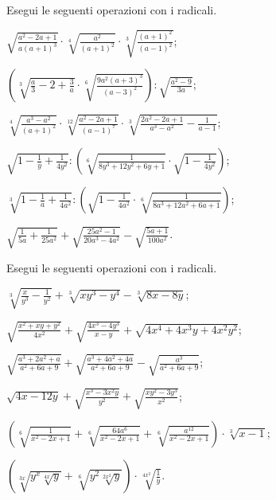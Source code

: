\begin{esercizio}[\Ast]
 \label{ese:2.81}
Esegui le seguenti operazioni con i radicali.
 \begin{enumeratea}
 \item $\sqrt{\frac{a^2-2a+1}{a(a+1)^3}}\cdot \sqrt[4]{\frac{a^2}{(a+1)^2}}\cdot \sqrt[3]{\frac{(a+1)^2}{(a-1)^2}}$;
 \item $\left(\sqrt[3]{\frac a 3-2+\frac 3 a}\cdot \sqrt[6]{\frac{9a^2(a+3)^3}{(a-3)^2}}\right):\sqrt{\frac{a^2-9}{3a}}$;
 \item $\sqrt[4]{\frac{a^3-a^2}{(a+1)^2}}\cdot \sqrt[12]{\frac{a^2-2a+1}{(a-1)^7}}\cdot \sqrt[3]{\frac{2a^2-2a+1}{a^3-a^2}-\frac 1{a-1}}$;
 \item $\sqrt{1-\frac 1 y+\frac 1{4y^2}}:\left(\sqrt[6]{\frac 1{8y^3+12y^2+6y+1}}\cdot \sqrt{1-\frac 1{4y^2}}\right)$;
 \item $\sqrt[3]{1-\frac 1 a+\frac 1{4a^2}}:\left(\sqrt{1-\frac 1{4a^2}}\cdot \sqrt[6]{\frac 1{8a^3+12a^2+6a+1}}\right)$;
 \item $\sqrt{\frac 1{5a}+\frac 1{25a^2}}+\sqrt{\frac{25a^2-1}{20a^3-4a^2}}-\sqrt{\frac{5a+1}{100a^2}}$.
 \end{enumeratea}
\end{esercizio}

\begin{esercizio}[\Ast]
 \label{ese:2.82}
Esegui le seguenti operazioni con i radicali.
 \begin{enumeratea}
 \item $\sqrt[3]{\frac x{y^3}-\frac 1{y^2}}+\sqrt[3]{xy^3-y^4}-\sqrt[3]{8x-8y}$;
 \item $\sqrt{\frac{x^2+xy+y^2}{4x^2}}+\sqrt{\frac{4x^3-4y^3}{x-y}}+\sqrt{4x^4+4x^3y+4x^2y^2}$;
 \item $\sqrt{\frac{a^3+2a^2+a}{a^2+6a+9}}+\sqrt{\frac{a^3+4a^2+4a}{a^2+6a+9}}-\sqrt{\frac{a^3}{a^2+6a+9}}$;
 \item $\sqrt{4x-12y}+\sqrt{\frac{x^3-3x^2y}{y^2}}+\sqrt{\frac{xy^2-3y^3}{x^2}}$;
 \item $\left(\sqrt[6]{\frac 1{x^2-2x+1}}+\sqrt[6]{\frac{64a^6}{x^2-2x+1}}+\sqrt[6]{\frac{a^{12}}{x^2-2x+1}}\right)\cdot \sqrt[3]{x-1}$;
 \item $\left(\sqrt[3x]{y^x\sqrt[4x]y}+\sqrt[6]{y^2\sqrt[2x^2]y}\right)\cdot \sqrt[4x^2]{\frac 1 y}$.
 \end{enumeratea}
\end{esercizio}

